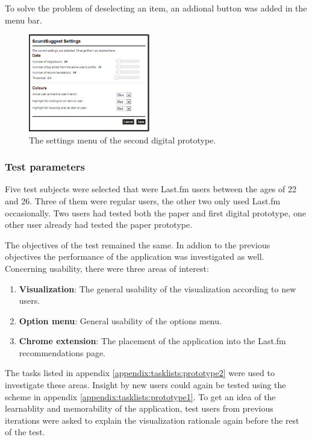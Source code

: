 To solve the problem of deselecting an item, an addional button was added in the menu bar.

\begin{figure}%
	\begin{center}
		\includegraphics[width=200px]{img/prototype_soundsuggest2_settings}%
	\end{center}
	\caption{The settings menu of the second digital prototype.}%
	\label{figure:prototype_soundsuggest2_settings}%
\end{figure}


\subsubsection{Test parameters}\label{chapter:prototype:section:soundsuggest2:setup}

Five test subjects were selected that were Last.fm users between the ages of 22 and 26. Three of them were regular users, the other two only used Last.fm occasionally. Two users had tested both the paper and first digital prototype, one other user already had tested the paper prototype.

The objectives of the test remained the same. In addion to the previous objectives the performance of the application was investigated as well. Concerning usability, there were three areas of interest:

\begin{enumerate}
	\item \textbf{Visualization}: The general usability of the visualization according to new users.
	\item \textbf{Option menu}: General usability of the options menu.
	\item \textbf{Chrome extension}: The placement of the application into the Last.fm recommendations page.
\end{enumerate}

The tasks listed in appendix \ref{appendix:tasklists:prototype2} were used to investigate these areas. Insight by new users could again be tested using the scheme in appendix \ref{appendix:tasklists:prototype1}. To get an idea of the learnablity and memorability of the application, test users from previous iterations were asked to explain the visualization rationale again before the rest of the test.


